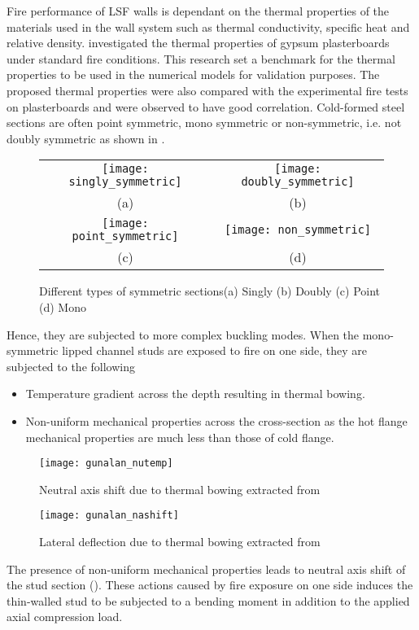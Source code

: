 Fire performance of LSF walls is dependant on the thermal properties of the materials used in the wall system such as thermal conductivity, specific heat and relative density. \citet{Keerthan2012} investigated the thermal properties of gypsum plasterboards under standard fire conditions. This research set a benchmark for the thermal properties to be used in the numerical models for validation purposes. The proposed thermal properties were also compared with the experimental fire tests on plasterboards and were observed to have good correlation. Cold-formed steel sections are often point symmetric, mono symmetric or non-symmetric, i.e. not doubly symmetric as shown in . 
\begin{figure}[!htbp]
	\begin{center}
		\begin{tabular}{cc}
			\texttt{[image: singly\_symmetric]} & \texttt{[image: doubly\_symmetric]} \\ 
			(a) & (b)  \\ 
			\texttt{[image: point\_symmetric]} & \texttt{[image: non\_symmetric]} \\ 
			(c) & (d)  \\
		\end{tabular} 
		\caption{Different types of symmetric sections(a) Singly (b) Doubly (c) Point (d) Mono}
		\label{fig:symmetry}
	\end{center}
\end{figure}
Hence, they are subjected to more complex buckling modes. When the mono-symmetric lipped channel studs are exposed to fire on one side, they are subjected to the following
\begin{itemize}
	\item Temperature gradient across the depth resulting in thermal bowing.
	\item Non-uniform mechanical properties across the cross-section as the hot flange mechanical properties are much less than those of cold flange.
\end{itemize}
\begin{figure}[htbp]
	\centering	
		\texttt{[image: gunalan\_nutemp]}
		\caption{Neutral axis shift due to thermal bowing extracted from }
		\label{fig:gunalan_nutemp}
\end{figure}
\begin{figure}[htbp]
	\centering	
		\texttt{[image: gunalan\_nashift]}
		\caption{Lateral deflection due to thermal bowing extracted from }
		\label{fig:gunalan_nashift}
\end{figure}
The presence of non-uniform mechanical properties leads to neutral axis shift of the stud section (). These actions caused by fire exposure on one side induces the thin-walled stud to be subjected to a bending moment in addition to the applied axial compression load.

